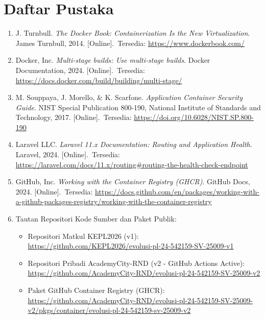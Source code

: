 \chapter{Daftar Pustaka}

\begin{enumerate}
    \item \label{turnbull_docker} J. Turnbull. \textit{The Docker Book: Containerization Is the New Virtualization}. James Turnbull, 2014. \mbox{[Online]. Tersedia:} \url{https://www.dockerbook.com/}

    \item \label{docker_multistage} Docker, Inc. \textit{Multi-stage builds: Use multi-stage builds}. Docker Documentation, 2024. \mbox{[Online]. Tersedia:} \url{https://docs.docker.com/build/building/multi-stage/}

    \item \label{nist_container} M. Souppaya, J. Morello, \& K. Scarfone. \textit{Application Container Security Guide}. NIST Special Publication 800-190, National Institute of Standards and Technology, 2017. \mbox{[Online]. Tersedia:} \url{https://doi.org/10.6028/NIST.SP.800-190}

    \item \label{laravel_health} Laravel LLC. \textit{Laravel 11.x Documentation: Routing and Application Health}. Laravel, 2024. \mbox{[Online]. Tersedia:} \url{https://laravel.com/docs/11.x/routing#routing-the-health-check-endpoint}

    \item \label{ghcr_docs} GitHub, Inc. \textit{Working with the Container Registry (GHCR)}. GitHub Docs, 2024. \mbox{[Online]. Tersedia:} \url{https://docs.github.com/en/packages/working-with-a-github-packages-registry/working-with-the-container-registry}

    \item \label{sourcecode} Tautan Repositori Kode Sumber dan Paket Publik:
    \begin{itemize}
        \item Repositori Matkul KEPL2026 (v1):\\
        \url{https://github.com/KEPL2026/evolusi-pl-24-542159-SV-25009-v1}

        \item Repositori Pribadi AcademyCity-RND (v2 - GitHub Actions Active):\\
        \url{https://github.com/AcademyCity-RND/evolusi-pl-24-542159-SV-25009-v2}

        \item Paket GitHub Container Registry (GHCR):\\
        \url{https://github.com/AcademyCity-RND/evolusi-pl-24-542159-SV-25009-v2/pkgs/container/evolusi-pl-24-542159-sv-25009-v2}
    \end{itemize}
\end{enumerate}
